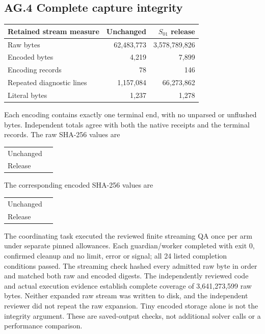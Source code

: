 \subsection*{AG.4 Complete capture integrity}
\begin{center}\small
\begin{tabular}{@{}L{58mm}rr@{}}\toprule
Retained stream measure & Unchanged & $S_{01}$ release\\\midrule
Raw bytes & 62,483,773 & 3,578,789,826\\
Encoded bytes & 4,219 & 7,899\\
Encoding records & 78 & 146\\
Repeated diagnostic lines & 1,157,084 & 66,273,862\\
Literal bytes & 1,237 & 1,278\\\bottomrule
\end{tabular}
\end{center}
Each encoding contains exactly one terminal end, with no unparsed or
unflushed bytes. Independent totals agree with both the native receipts
and the terminal records. The raw SHA-256 values are
\begin{center}\small
\begin{tabular}{@{}L{22mm}L{125mm}@{}}
Unchanged & \\[3pt]
Release & 
\end{tabular}
\end{center}
The corresponding encoded SHA-256 values are
\begin{center}\small
\begin{tabular}{@{}L{22mm}L{125mm}@{}}
Unchanged & \\[3pt]
Release & 
\end{tabular}
\end{center}
The coordinating task executed the reviewed finite streaming QA once
per arm under separate pinned allowances. Each guardian/worker completed
with exit 0, confirmed cleanup and no limit, error or signal; all 24
listed completion conditions passed. The streaming check hashed every
admitted raw byte in order and matched both raw and encoded digests.
The independently reviewed code and actual execution evidence establish
complete coverage of 3,641,273,599 raw bytes. Neither expanded raw stream
was written to disk, and the independent reviewer did not repeat the
raw expansion. Tiny encoded storage alone is not the integrity argument.
These are saved-output checks, not additional solver calls or a
performance comparison.

